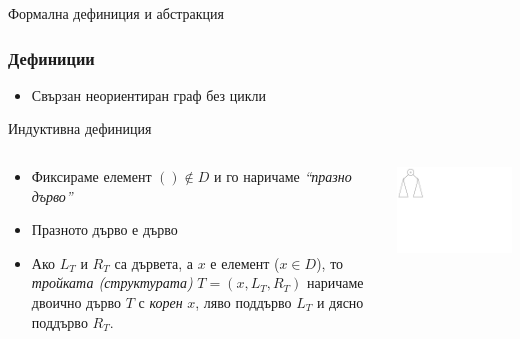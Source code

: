 \documentclass{beamer}
\begin{document}
\begin{frame}
\centerline{Формална дефиниция и абстракция}
\end{frame}




\begin{frame}[fragile]
\frametitle{Дефиниции}

    \begin{itemize}
      \item Свързан неориентиран граф без цикли 
    \end{itemize}

    \vspace{1.5em}
     Индуктивна дефиниция

\begin{columns}[t]
  \begin{column}{0.65\textwidth}


    \begin{itemize}
      \item Фиксираме елемент $() \notin D$ и го наричаме \emph{``празно дърво''}
      \item Празното дърво е дърво 
      \item Ако $L_T$ и $R_T$ са дървета, а $x$ е елемент ($x \in D$), то \emph{тройката (структурата)} $T=(x,L_T,R_T)$ наричаме двоично дърво $T$ с \emph{корен} $x$, ляво поддърво $L_T$ и дясно поддърво $R_T$.
    \end{itemize}

  \end{column}
  \begin{column}{0.35\textwidth}

    \includegraphics[width=9cm]{images/tree_recursive}

  \end{column}
\end{columns}


\end{frame}
\end{document}
